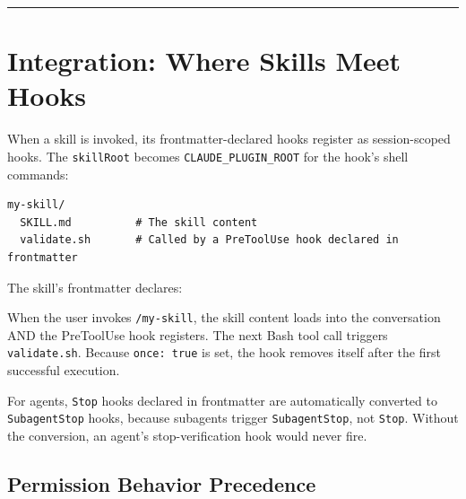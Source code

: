 \documentclass[
  english,
  11pt,
  letterpaper,
]{book}
\newenvironment{Shaded}{\begin{snugshade}}{\end{snugshade}}
\newcommand{\AttributeTok}[1]{\textcolor[rgb]{0.40,0.45,0.13}{#1}}
\newcommand{\CharTok}[1]{\textcolor[rgb]{0.13,0.47,0.30}{#1}}
\newcommand{\FunctionTok}[1]{\textcolor[rgb]{0.28,0.35,0.67}{#1}}
\newcommand{\KeywordTok}[1]{\textcolor[rgb]{0.00,0.23,0.31}{\textbf{#1}}}
\newcommand{\StringTok}[1]{\textcolor[rgb]{0.13,0.47,0.30}{#1}}
\begin{document}
\begin{center}\rule{0.5\linewidth}{0.5pt}\end{center}

\section{Integration: Where Skills Meet
Hooks}\label{integration-where-skills-meet-hooks}

When a skill is invoked, its frontmatter-declared hooks register as
session-scoped hooks. The \texttt{skillRoot} becomes
\texttt{CLAUDE\_PLUGIN\_ROOT} for the hook's shell commands:

\begin{verbatim}
my-skill/
  SKILL.md          # The skill content
  validate.sh       # Called by a PreToolUse hook declared in frontmatter
\end{verbatim}

The skill's frontmatter declares:

\begin{Shaded}
\end{Shaded}

When the user invokes \texttt{/my-skill}, the skill content loads into
the conversation AND the PreToolUse hook registers. The next Bash tool
call triggers \texttt{validate.sh}. Because \texttt{once:\ true} is set,
the hook removes itself after the first successful execution.

For agents, \texttt{Stop} hooks declared in frontmatter are
automatically converted to \texttt{SubagentStop} hooks, because
subagents trigger \texttt{SubagentStop}, not \texttt{Stop}. Without the
conversion, an agent's stop-verification hook would never fire.

\subsection{Permission Behavior
Precedence}\label{permission-behavior-precedence}
\end{document}
